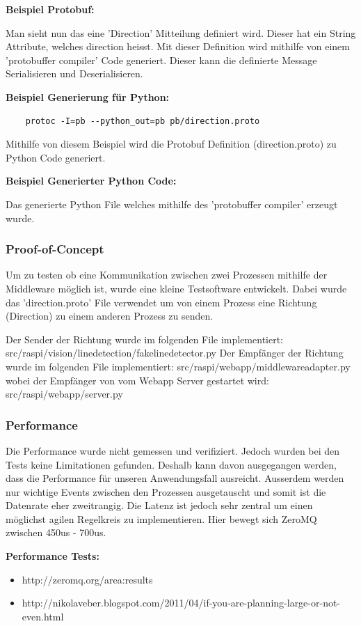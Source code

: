 \documentclass[../../main.tex]{subfiles}
\begin{document}
\textbf{Beispiel Protobuf:}

Man sieht nun das eine 'Direction' Mitteilung definiert wird. Dieser hat ein String Attribute, welches direction heisst. Mit dieser Definition
wird mithilfe von einem 'protobuffer compiler' Code generiert. Dieser kann die definierte Message Serialisieren und Deserialisieren.

\textbf{Beispiel Generierung für Python:}
\begin{lstlisting}
    protoc -I=pb --python_out=pb pb/direction.proto
\end{lstlisting}
Mithilfe von diesem Beispiel wird die Protobuf Definition (direction.proto) zu Python Code generiert.

\textbf{Beispiel Generierter Python Code:}

Das generierte Python File welches mithilfe des 'protobuffer compiler' erzeugt wurde.

\subsubsection{Proof-of-Concept}
Um zu testen ob eine Kommunikation zwischen zwei Prozessen mithilfe der Middleware möglich ist, wurde eine kleine Testsoftware entwickelt.
Dabei wurde das 'direction.proto' File verwendet um von einem Prozess eine Richtung (Direction) zu einem anderen Prozess zu senden.

Der Sender der Richtung wurde im folgenden File implementiert: src/raspi/vision/linedetection/fakelinedetector.py
Der Empfänger der Richtung wurde im folgenden File implementiert: src/raspi/webapp/middlewareadapter.py
wobei der Empfänger von vom Webapp Server gestartet wird: src/raspi/webapp/server.py

\subsubsection{Performance}
Die Performance wurde nicht gemessen und verifiziert. Jedoch wurden bei den Tests keine Limitationen gefunden. Deshalb kann davon ausgegangen werden,
dass die Performance für unseren Anwendungsfall ausreicht. Ausserdem werden nur wichtige Events zwischen den Prozessen ausgetauscht und somit ist die Datenrate
eher zweitrangig. Die Latenz ist jedoch sehr zentral um einen möglichst agilen Regelkreis zu implementieren. Hier bewegt sich ZeroMQ zwischen 450us - 700us.

\textbf{Performance Tests:}
\begin{itemize}
    \item http://zeromq.org/area:results
    \item http://nikolaveber.blogspot.com/2011/04/if-you-are-planning-large-or-not-even.html
\end{itemize}
\end{document}
